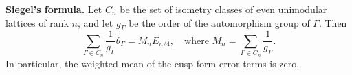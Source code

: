 \textbf{Siegel's formula.} Let $C_n$ be the set of isometry classes of even unimodular lattices of rank $n$, and let $g_\Gamma$ be the order of the automorphism group of $\Gamma$. Then
$$\sum_{\Gamma \in C_n} \frac{1}{g_\Gamma} \theta_\Gamma = M_n E_{n/4}, \quad \text{where } M_n = \sum_{\Gamma \in C_n} \frac{1}{g_\Gamma}.$$
In particular, the weighted mean of the cusp form error terms is zero.

